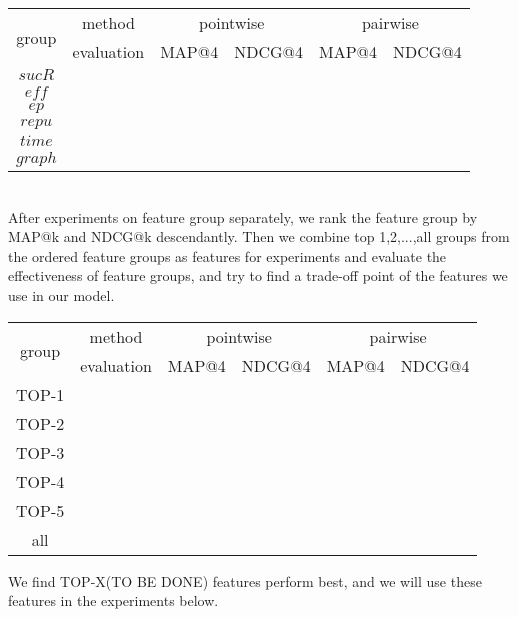 \documentclass{sig-alternate-05-2015}
\begin{document}
\begin{tabular}{|c|c|c|c|c|c|}

\hline
\multirow{2}{*}{group}  & method  & \multicolumn{2}{c|}{pointwise}  & \multicolumn{2}{c|}{pairwise} \\
\cline{2-6}
 &evaluation&MAP@4&NDCG@4&MAP@4&NDCG@4 \\
\hline
$sucR$ & & & & &\\
\hline
$eff$ & & & & &\\
\hline	
$ep$ & & & & &\\
\hline
$repu$ & & & & &\\
\hline
$time$ & & & & &\\
\hline
$graph$ & & & & &\\
\hline
\end{tabular}
\\
After experiments on feature group separately, we rank the feature group by MAP@k and NDCG@k descendantly. Then we combine top 1,2,...,all groups from the ordered feature groups as features for experiments and evaluate the effectiveness of feature groups, and try to find a trade-off point of the features we use in our model.\\
\begin{tabular}{|c|c|c|c|c|c|}

\hline
\multirow{2}{*}{group}  & method  & \multicolumn{2}{c|}{pointwise}  & \multicolumn{2}{c|}{pairwise} \\
\cline{2-6}
 &evaluation&MAP@4&NDCG@4&MAP@4&NDCG@4 \\
\hline
TOP-1 & & & & &\\
\hline
TOP-2 & & & & &\\
\hline	
TOP-3 & & & & &\\
\hline
TOP-4 & & & & &\\
\hline
TOP-5 & & & & &\\
\hline
all & & & & &\\
\hline
\end{tabular}
We find TOP-X(TO BE DONE) features perform best, and we will use these features in the experiments below.
\end{document}

